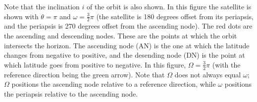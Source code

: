 \documentclass{article}
\begin{document}
Note that the inclination $i$ of the orbit is also shown. In this figure the satellite is shown with $\theta=\pi$ and $\omega=\frac{3}{2}\pi$ (the satellite is 180 degrees offset from its periapsis, and the periapsis is 270 degrees offset from the ascending node). The red dots are the ascending and descending nodes. These are the points at which the orbit intersects the horizon. The ascending node (AN) is the one at which the latitude changes from negative to positive, and the desending node (DN) is the point at which latitude goes from positive to negative. In this figure, $\Omega=\frac{3}{2}\pi$ (with the reference direction being the green arrow). Note that $\Omega$ does not always equal $\omega$; $\Omega$ positions the ascending node relative to a reference direction, while $\omega$ positions the periapsis relative to the ascending node.
\end{document}
